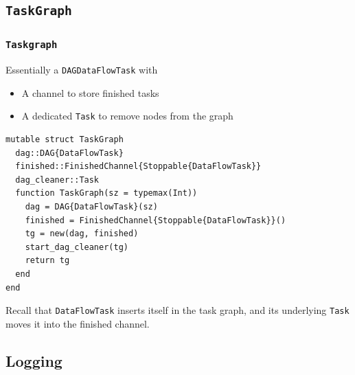 \documentclass{beamer}
\begin{document}
\subsection{\texttt{TaskGraph}}

\begin{frame}[fragile]
\frametitle{{\texttt{Taskgraph}}}  
  
Essentially a \texttt{DAG{DataFlowTask}} with
\begin{itemize}
  \item A channel to store finished tasks  
  \item A dedicated \texttt{Task} to remove nodes from the graph
\end{itemize}

\hrulefill
\begin{verbatim}
mutable struct TaskGraph
  dag::DAG{DataFlowTask}
  finished::FinishedChannel{Stoppable{DataFlowTask}}
  dag_cleaner::Task
  function TaskGraph(sz = typemax(Int))
    dag = DAG{DataFlowTask}(sz)
    finished = FinishedChannel{Stoppable{DataFlowTask}}()
    tg = new(dag, finished)
    start_dag_cleaner(tg)
    return tg
  end
end
\end{verbatim}

\begin{alertblock}{}
\small{Recall that \texttt{DataFlowTask} inserts itself in the task
graph, and its underlying \texttt{Task} moves it into the finished
channel.}
\end{alertblock}
  
\end{frame}

\subsection{Logging}
\end{document}
